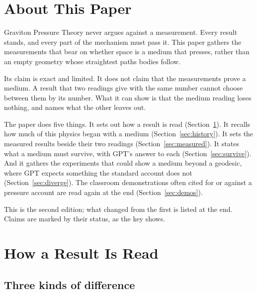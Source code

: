 \newcommand{\gptpart}{29}
\newcommand{\gpttitle}{Experimental Divergence}
\newcommand{\gptsubtitle}{Physical Phenomena vs Abstract Geometry}
\newcommand{\gptdate}{November 2026}

\graphicspath{{figs/}}

\gptitle

\section*{About This Paper}

Graviton Pressure Theory never argues against a measurement. Every result stands, and every part of the mechanism must pass it. This paper gathers the measurements that bear on whether space is a medium that presses, rather than an empty geometry whose straightest paths bodies follow.

Its claim is exact and limited.  It does not claim that the measurements prove a medium. A result that two readings give with the same number cannot choose between them by its number. What it can show is that the medium reading loses nothing, and names what the other leaves out.

The paper does five things. It sets out how a result is read (Section~\ref{sec:reading}). It recalls how much of this physics began with a medium (Section~\ref{sec:history}). It sets the measured results beside their two readings (Section~\ref{sec:measured}). It states what a medium must survive, with GPT's answer to each (Section~\ref{sec:survive}). And it gathers the experiments that could show a medium beyond a geodesic, where GPT expects something the standard account does not (Section~\ref{sec:diverge}). The classroom demonstrations often cited for or against a pressure account are read again at the end (Section~\ref{sec:demos}).

This is the second edition; what changed from the first is listed at the end. Claims are marked by their status, as the key shows.

\statuskey

\section{How a Result Is Read}\label{sec:reading}

\subsection{Three kinds of difference}

